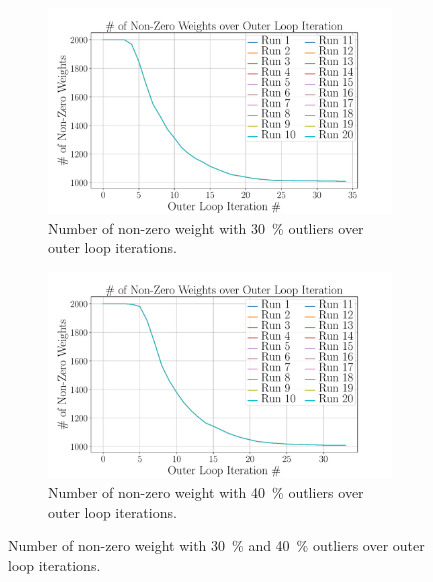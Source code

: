 \begin{figure}[!h]
	\centering
	\begin{subfigure}[b]{0.48\textwidth}
		\centering
		\includegraphics[width=\textwidth]{chapters/2-pose-estimation/fig/GNC-TLS-w-run-30-conv.pdf}
		\caption{Number of non-zero weight with \SI{30}{\percent} outliers over outer loop iterations.}
		\label{app:GNC-TLS-w-run-30-conv}
	\end{subfigure}
	\hfill
	\begin{subfigure}[b]{0.48\textwidth}
		\centering
		\includegraphics[width=\textwidth]{chapters/2-pose-estimation/fig/GNC-TLS-w-run-40-conv.pdf}
		\caption{Number of non-zero weight with \SI{40}{\percent} outliers over outer loop iterations.}
		\label{app:GNC-TLS-w-run-40-conv}
	\end{subfigure}
	\caption{Number of non-zero weight with \SI{30}{\percent} and \SI{40}{\percent} outliers over outer loop iterations.}
	\label{app:GNC-TLS-w-run-30-40-conv}
\end{figure}
